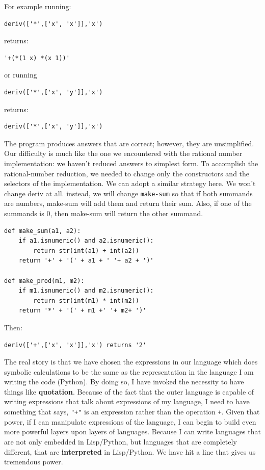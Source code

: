 \documentclass[a4paper,twoside]{article}
\numberwithin{equation}{section}
\begin{document}
For example running:
\begin{lstlisting}
deriv(['*',['x', 'x']],'x')
\end{lstlisting}
returns:
\begin{lstlisting}
'+(*(1 x) *(x 1))'
\end{lstlisting}
or running
\begin{lstlisting}
deriv(['*',['x', 'y']],'x')
\end{lstlisting}
returns:
\begin{lstlisting}
deriv(['*',['x', 'y']],'x')
\end{lstlisting}
The program produces answers that are correct; however, they are unsimplified.
Our diﬃculty is much like the one we encountered with the rational number implementation: we haven't reduced answers to simplest form. To accomplish the rational-number reduction, we needed to change only the constructors and the selectors of the implementation. We can adopt a similar strategy here. We won't change deriv at all. instead, we will change \texttt{make-sum} so that if both summands are numbers, make-sum will add them and return their sum. Also, if one of the summands is 0, then make-sum will return the other summand.
\begin{lstlisting}
def make_sum(a1, a2):
    if a1.isnumeric() and a2.isnumeric():
        return str(int(a1) + int(a2))
    return '+' + '(' + a1 + ' '+ a2 + ')'

def make_prod(m1, m2):
    if m1.isnumeric() and m2.isnumeric():
        return str(int(m1) * int(m2))
    return '*' + '(' + m1 +' '+ m2+ ')'
\end{lstlisting}
Then:
\begin{lstlisting}
deriv(['+',['x', 'x']],'x') returns '2'
\end{lstlisting}
The real story is that we have chosen the expressions in our language which does symbolic calculations to be the same as the representation in the language I am writing the code (Python). By doing so, I have invoked the necessity to have things like \textbf{quotation}. Because of the fact that the outer language is capable of writing expressions that talk about expressions of my language, I need to have something that says, \texttt{"+"} is an expression rather than the operation \texttt{+}. Given that power, if I can manipulate expressions of the language, I can begin to build even more powerful layers upon layers of languages. Because I can write languages that are not only embedded in Lisp/Python, but languages that are completely different, that are \textbf{interpreted} in Lisp/Python. We have hit a line that gives us tremendous power.
\end{document}

